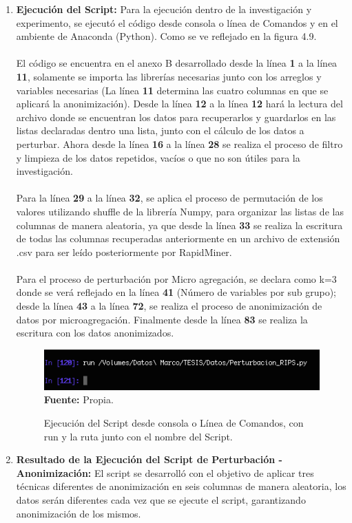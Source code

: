 \documentclass[a4paper,openright,12pt]{book}
\theoremstyle{definition}
\theoremstyle{remark}
\begin{document}
\begin{enumerate}
   \item \textbf{Ejecución del Script:}  Para la ejecución dentro de la investigación y experimento, se ejecutó el código desde consola o línea de Comandos y en el ambiente de Anaconda (Python). Como se ve reflejado en la figura 4.9.\\\\El código se encuentra en el anexo B desarrollado desde la línea \textbf{1} a la línea \textbf{11}, solamente se importa las librerías necesarias junto con los arreglos y variables necesarias (La línea \textbf{11} determina las cuatro columnas en que se aplicará la anonimización). Desde la línea \textbf{12} a la línea \textbf{12} hará la lectura del archivo donde se encuentran los datos para recuperarlos y guardarlos en las listas declaradas dentro una lista, junto con el cálculo de los datos a perturbar. Ahora desde la línea \textbf{16} a la línea \textbf{28} se realiza el proceso de filtro y limpieza de los datos repetidos, vacíos o que no son útiles para la investigación.\\\\
Para la línea \textbf{29} a la línea \textbf{32}, se aplica el proceso de permutación de los valores utilizando shuffle de la librería Numpy, para organizar las listas de las columnas de manera aleatoria, ya que desde la línea \textbf{33} se realiza la escritura de todas las columnas recuperadas anteriormente en un archivo de extensión .csv para ser leído posteriormente por RapidMiner.\\\\Para el proceso de perturbación por Micro agregación, se declara como k=3 donde se verá reflejado en la línea \textbf{41} (Número de variables por sub grupo); desde la línea \textbf{43} a la línea \textbf{72}, se realiza el proceso de anonimización de datos por microagregación. Finalmente desde la línea \textbf{83} se realiza la escritura con los datos anonimizados.
\begin{figure}[ht]
\centering
\caption{Ejecución del Script desde consola o Línea de Comandos, con run y la ruta junto con el nombre del Script.} 
 \includegraphics[scale=0.85]{Ejecucion_Python}
\label{fig:Ejecucion_Python}
\\ \textbf{Fuente:} Propia.
\end{figure}
    \item \textbf{Resultado de la Ejecución del Script de Perturbación - Anonimización:} El script se desarrolló con el objetivo de aplicar tres técnicas diferentes de anonimización en seis columnas de manera aleatoria, los datos serán diferentes cada vez que se ejecute el script, garantizando anonimización de los mismos. 
\end{enumerate}
\end{document}

